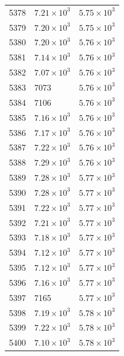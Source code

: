 \begin{table}[H]
\begin{tabular}{lll}
5378 & $\displaystyle 7.21 \times 10^{3}$ & $\displaystyle 5.75 \times 10^{3}$ \\
5379 & $\displaystyle 7.20 \times 10^{3}$ & $\displaystyle 5.75 \times 10^{3}$ \\
5380 & $\displaystyle 7.20 \times 10^{3}$ & $\displaystyle 5.76 \times 10^{3}$ \\
5381 & $\displaystyle 7.14 \times 10^{3}$ & $\displaystyle 5.76 \times 10^{3}$ \\
5382 & $\displaystyle 7.07 \times 10^{3}$ & $\displaystyle 5.76 \times 10^{3}$ \\
5383 & 7073 & $\displaystyle 5.76 \times 10^{3}$ \\
5384 & 7106 & $\displaystyle 5.76 \times 10^{3}$ \\
5385 & $\displaystyle 7.16 \times 10^{3}$ & $\displaystyle 5.76 \times 10^{3}$ \\
5386 & $\displaystyle 7.17 \times 10^{3}$ & $\displaystyle 5.76 \times 10^{3}$ \\
5387 & $\displaystyle 7.22 \times 10^{3}$ & $\displaystyle 5.76 \times 10^{3}$ \\
5388 & $\displaystyle 7.29 \times 10^{3}$ & $\displaystyle 5.76 \times 10^{3}$ \\
5389 & $\displaystyle 7.28 \times 10^{3}$ & $\displaystyle 5.77 \times 10^{3}$ \\
5390 & $\displaystyle 7.28 \times 10^{3}$ & $\displaystyle 5.77 \times 10^{3}$ \\
5391 & $\displaystyle 7.22 \times 10^{3}$ & $\displaystyle 5.77 \times 10^{3}$ \\
5392 & $\displaystyle 7.21 \times 10^{3}$ & $\displaystyle 5.77 \times 10^{3}$ \\
5393 & $\displaystyle 7.18 \times 10^{3}$ & $\displaystyle 5.77 \times 10^{3}$ \\
5394 & $\displaystyle 7.12 \times 10^{3}$ & $\displaystyle 5.77 \times 10^{3}$ \\
5395 & $\displaystyle 7.12 \times 10^{3}$ & $\displaystyle 5.77 \times 10^{3}$ \\
5396 & $\displaystyle 7.16 \times 10^{3}$ & $\displaystyle 5.77 \times 10^{3}$ \\
5397 & 7165 & $\displaystyle 5.77 \times 10^{3}$ \\
5398 & $\displaystyle 7.19 \times 10^{3}$ & $\displaystyle 5.78 \times 10^{3}$ \\
5399 & $\displaystyle 7.22 \times 10^{3}$ & $\displaystyle 5.78 \times 10^{3}$ \\
5400 & $\displaystyle 7.10 \times 10^{3}$ & $\displaystyle 5.78 \times 10^{3}$ \\

\end{tabular}
\end{table}
